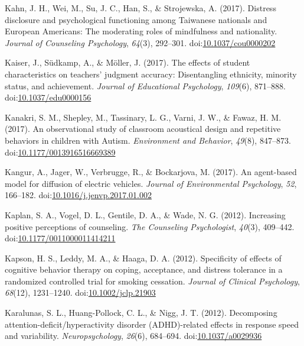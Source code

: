 \documentclass[english,man]{apa6}
\theoremstyle{definition}
\theoremstyle{definition}
\theoremstyle{definition}
\theoremstyle{remark}
\begin{document}
\hypertarget{ref-Kahn2017}{}
Kahn, J. H., Wei, M., Su, J. C., Han, S., \& Strojewska, A. (2017).
Distress disclosure and psychological functioning among Taiwanese
nationals and European Americans: The moderating roles of mindfulness
and nationality. \emph{Journal of Counseling Psychology}, \emph{64}(3),
292--301.
doi:\href{https://doi.org/10.1037/cou0000202}{10.1037/cou0000202}

\hypertarget{ref-Kaiser2017}{}
Kaiser, J., Südkamp, A., \& Möller, J. (2017). The effects of student
characteristics on teachers' judgment accuracy: Disentangling ethnicity,
minority status, and achievement. \emph{Journal of Educational
Psychology}, \emph{109}(6), 871--888.
doi:\href{https://doi.org/10.1037/edu0000156}{10.1037/edu0000156}

\hypertarget{ref-Kanakri2017}{}
Kanakri, S. M., Shepley, M., Tassinary, L. G., Varni, J. W., \& Fawaz,
H. M. (2017). An observational study of classroom acoustical design and
repetitive behaviors in children with Autism. \emph{Environment and
Behavior}, \emph{49}(8), 847--873.
doi:\href{https://doi.org/10.1177/0013916516669389}{10.1177/0013916516669389}

\hypertarget{ref-Kangur2017}{}
Kangur, A., Jager, W., Verbrugge, R., \& Bockarjova, M. (2017). An
agent-based model for diffusion of electric vehicles. \emph{Journal of
Environmental Psychology}, \emph{52}, 166--182.
doi:\href{https://doi.org/10.1016/j.jenvp.2017.01.002}{10.1016/j.jenvp.2017.01.002}

\hypertarget{ref-Kaplan2012}{}
Kaplan, S. A., Vogel, D. L., Gentile, D. A., \& Wade, N. G. (2012).
Increasing positive perceptions of counseling. \emph{The Counseling
Psychologist}, \emph{40}(3), 409--442.
doi:\href{https://doi.org/10.1177/0011000011414211}{10.1177/0011000011414211}

\hypertarget{ref-Kapson2012}{}
Kapson, H. S., Leddy, M. A., \& Haaga, D. A. (2012). Specificity of
effects of cognitive behavior therapy on coping, acceptance, and
distress tolerance in a randomized controlled trial for smoking
cessation. \emph{Journal of Clinical Psychology}, \emph{68}(12),
1231--1240.
doi:\href{https://doi.org/10.1002/jclp.21903}{10.1002/jclp.21903}

\hypertarget{ref-Karalunas2012}{}
Karalunas, S. L., Huang-Pollock, C. L., \& Nigg, J. T. (2012).
Decomposing attention-deficit/hyperactivity disorder (ADHD)-related
effects in response speed and variability. \emph{Neuropsychology},
\emph{26}(6), 684--694.
doi:\href{https://doi.org/10.1037/a0029936}{10.1037/a0029936}
\end{document}
